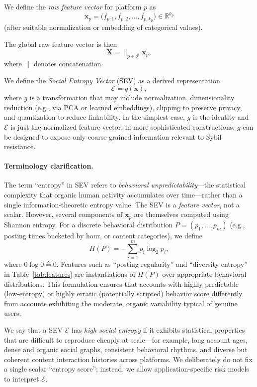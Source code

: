 \documentclass[11pt]{article}
\newcommand{\bigparallel}{\mathop{\|}}
\begin{document}
We define the \emph{raw feature vector} for platform $p$ as
\[
  \mathbf{x}_p = \big( f_{p,1}, f_{p,2}, \dots, f_{p,k_p} \big) \in \mathbb{R}^{k_p}
\]
(after suitable normalization or embedding of categorical values).

The global raw feature vector is then
\[
  \mathbf{X} = \bigparallel_{p \in \mathcal{P}} \mathbf{x}_p,
\]
where $\parallel$ denotes concatenation.

We define the \emph{Social Entropy Vector} (SEV) as a derived representation
\[
  \mathcal{E} = g(\mathbf{x}),
\]
where $g$ is a transformation that may include normalization, dimensionality reduction (e.g., via PCA or learned embeddings), clipping to preserve privacy, and quantization to reduce linkability. In the simplest case, $g$ is the identity and $\mathcal{E}$ is just the normalized feature vector; in more sophisticated constructions, $g$ can be designed to expose only coarse-grained information relevant to Sybil resistance.

\paragraph{Terminology clarification.} The term ``entropy'' in SEV refers to \emph{behavioral unpredictability}---the statistical complexity that organic human activity accumulates over time---rather than a single information-theoretic entropy value. The SEV is a \emph{feature vector}, not a scalar. However, several components of $\mathbf{x}_p$ are themselves computed using Shannon entropy. For a discrete behavioral distribution $P = (p_1, \ldots, p_m)$ (e.g., posting times bucketed by hour, or content categories), we define
\[
  H(P) = -\sum_{i=1}^{m} p_i \log_2 p_i,
\]
where $0 \log 0 \triangleq 0$. Features such as ``posting regularity'' and ``diversity entropy'' in Table~\ref{tab:features} are instantiations of $H(P)$ over appropriate behavioral distributions. This formulation ensures that accounts with highly predictable (low-entropy) or highly erratic (potentially scripted) behavior score differently from accounts exhibiting the moderate, organic variability typical of genuine users.

We say that a SEV $\mathcal{E}$ has \emph{high social entropy} if it exhibits statistical properties that are difficult to reproduce cheaply at scale---for example, long account ages, dense and organic social graphs, consistent behavioral rhythms, and diverse but coherent content interaction histories across platforms. We deliberately do not fix a single scalar ``entropy score''; instead, we allow application-specific risk models to interpret $\mathcal{E}$.
\end{document}
